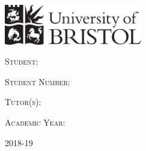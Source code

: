 
\begingroup
\thispagestyle{empty}

\setlength{\parindent}{0pt}
\begin{minipage}[b][2.0cm]{0.5\linewidth}
\vfill\fontsize{14}{14}\selectfont\textit{\department} 
\end{minipage}
\begin{minipage}[b][2.0cm]{0.45\linewidth}
\hfill\includegraphics[width=6.0cm]{UoB-logo-black.pdf}
\end{minipage}

\vspace{1.75in}\fontsize{36}{54}\selectfont\coursetitle

\vspace{.75in}\fontsize{36}{54}\selectfont\thetitle

\vspace{0.125in}\fontsize{14}{14}\selectfont\subtitle
\vfill
\begin{minipage}{0.48\textwidth}
\fontsize{16}{24}\selectfont\textsc{Student:}

\fontsize{16}{24}\selectfont\textsc{Student Number:}

\fontsize{16}{24}\selectfont\textsc{Tutor(s):}

\fontsize{16}{24}\selectfont\textsc{Academic Year:}
\end{minipage}
\begin{minipage}{0.48\textwidth}
\fontsize{16}{24}\selectfont\textnormal{\theauthor}

\fontsize{16}{24}\selectfont\textnormal{\studentid}

\fontsize{16}{24}\selectfont\textnormal{\tutor}

\fontsize{16}{24}\selectfont\textnormal{2018-19}
\end{minipage}


